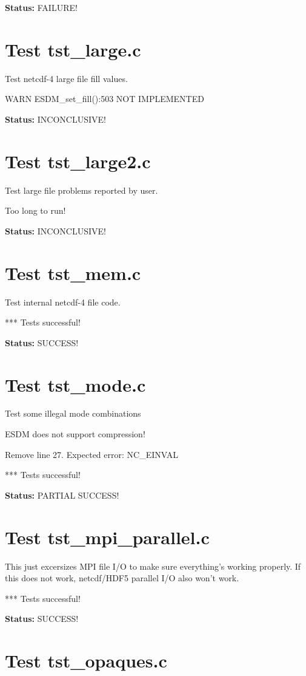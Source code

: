 {\bf \large Status: } FAILURE!

\section{Test tst\_large.c}

Test netcdf-4 large file fill values.

WARN ESDM\_set\_fill():503 NOT IMPLEMENTED

{\bf \large Status: } INCONCLUSIVE!

\section{Test tst\_large2.c}

Test large file problems reported by user.

Too long to run!

{\bf \large Status: } INCONCLUSIVE!

\section{Test tst\_mem.c}

Test internal netcdf-4 file code.

*** Tests successful!

{\bf \large Status: } SUCCESS!

\section{Test tst\_mode.c}

Test some illegal mode combinations

ESDM does not support compression!

Remove line 27. Expected error: NC\_EINVAL

*** Tests successful!

{\bf \large Status: } PARTIAL SUCCESS!

\section{Test tst\_mpi\_parallel.c}

This just excersizes MPI file I/O to make sure everything's working properly. If this does not work, netcdf/HDF5 parallel I/O also won't work.

*** Tests successful!

{\bf \large Status: } SUCCESS!

\section{Test tst\_opaques.c}

